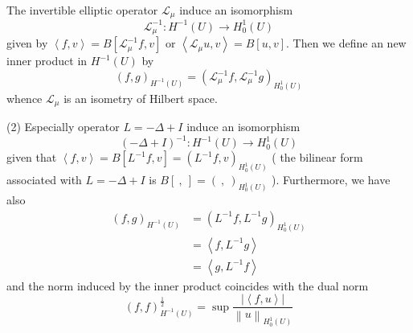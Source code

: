 \begin{corollary}
    \label{cor: Isomorphism between H_0^1 and H^{-1}}
    The invertible elliptic operator $\mathcal{L}_\mu$ induce an isomorphism
    \begin{equation*}
        \mathcal{L}_\mu^{-1}: H^{-1}\left(U\right) \rightarrow H_0^1(U)
    \end{equation*}
    given by $\left\langle f,v \right\rangle=B\left[\mathcal{L}_\mu^{-1}f,v\right]$ or  $\left\langle \mathcal{L}_\mu u,v \right\rangle=B\left[u,v\right]$.
    Then we define an new inner product in $H^{-1}\left(U\right)$ by
    \begin{equation*}
        \left(f,g\right)_{H^{-1}\left(U\right)}
        =
        \left(\mathcal{L}_\mu^{-1} f,\mathcal{L}_\mu^{-1} g\right)_{H^1_0\left(U\right)}
    \end{equation*}
    whence $\mathcal{L}_\mu$ is an isometry of Hilbert space.

    (2)
    Especially operator $L=-\Delta+I$ induce an isomorphism
    \begin{equation*}
        \left(-\Delta+I\right)^{-1} : H^{-1}\left(U\right) \rightarrow H_0^1(U)
    \end{equation*}
    given that
    $\left\langle f,v \right\rangle=B\left[L^{-1}f,v\right]=\left(L^{-1}f,v\right)_{H_0^1(U)}$ ( the bilinear form associated with $L=-\Delta+I$ is $B\left[\ , \ \right]=\left(\ , \ \right)_{H^1_0\left(U\right)}$ ).
    Furthermore, we have also
    \begin{equation*}
        \begin{aligned}
            \left(f,g\right)_{H^{-1}\left(U\right)}
             & = \left(L^{-1}f,L^{-1}g\right)_{H^1_0\left(U\right)} \\
             & = \left\langle f, L^{-1} g \right\rangle             \\
             & = \left\langle g, L^{-1} f \right\rangle
        \end{aligned}
    \end{equation*}
    and the norm induced by the inner product coincides with the dual norm
    \begin{equation*}
        \left(f,f\right)^{\frac{1}{2}}_{H^{-1}\left(U\right)}
        =
        \sup \frac{\left|\left\langle  f,u\right\rangle\right|}{\left\| u \right\|_{H^1_0\left(U\right)}}
    \end{equation*}
\end{corollary}



